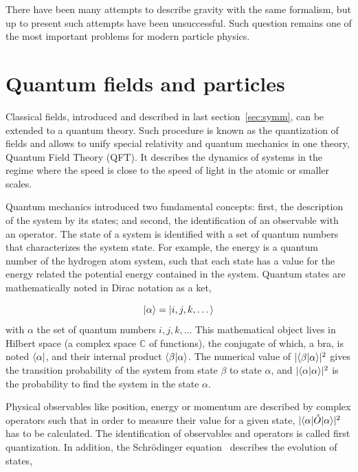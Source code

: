 There have been many attempts to describe gravity with the same formalism, but up to present such attempts have been unsuccessful. Such question remains one of the most important problems for modern particle physics.  

\section{Quantum fields and particles}
\label{sec:fields}

Classical fields, introduced and described in last section~\ref{sec:symm}, can be extended to a quantum theory. Such procedure is known as the quantization of fields and allows to unify special relativity and quantum mechanics in one theory, Quantum Field Theory (QFT). It describes the dynamics of systems in the regime where the speed is close to the speed of light in the atomic or smaller scales.

Quantum mechanics introduced two fundamental concepts: first, the description of the system by its states; and second, the identification of an observable with an operator. The state of a system is identified with a set of quantum numbers that characterizes the system state. For example, the energy is a quantum number of the hydrogen atom system, such that each state has a value for the energy related the potential energy contained in the system. Quantum states are mathematically noted in Dirac notation as a ket,

\begin{equation}
  \label{eq:DiracNot}
  | \alpha\rangle=| i,j,k,\dots\rangle
\end{equation}with $\alpha$ the set of quantum numbers $i,j,k,\dots$ This mathematical object lives in Hilbert space (a complex space $\mathds{C}$ of functions), the conjugate of which, a bra, is noted $\langle \alpha |$, and their internal product $\langle \beta | \alpha\rangle$. The numerical value of $|\langle \beta | \alpha\rangle|^{2}$ gives the transition probability of the system from state $\beta$ to state $\alpha$, and $|\langle \alpha | \alpha\rangle|^{2}$ is the probability to find the system in the state $\alpha$.

Physical observables like position, energy or momentum are described by complex operators such that in order to measure their value for a given state, $|\langle \alpha |\hat{O}| \alpha\rangle|^{2}$ has to be calculated. The identification of observables and operators is called first quantization. In addition, the Schr\"{o}dinger equation~\cite{ANDP:ANDP19263840404} describes the evolution of states,

